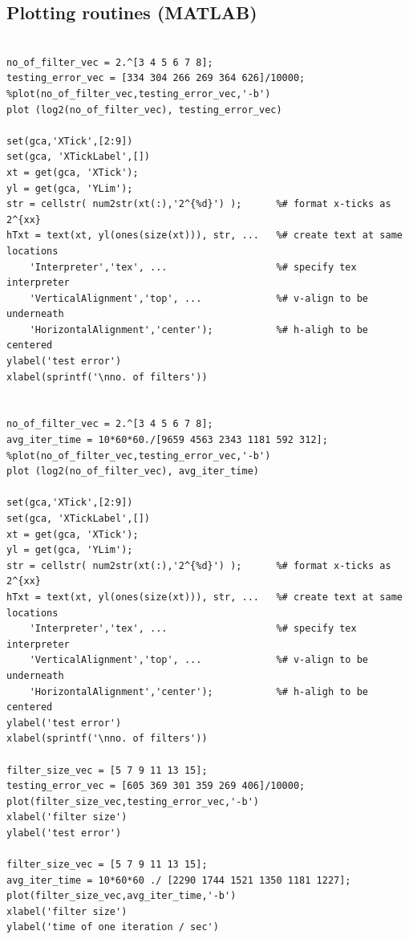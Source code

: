 \documentclass[10pt,twocolumn]{article}
\begin{document}
\subsection{Plotting routines (MATLAB)}
\begin{lstlisting}

no_of_filter_vec = 2.^[3 4 5 6 7 8];
testing_error_vec = [334 304 266 269 364 626]/10000;
%plot(no_of_filter_vec,testing_error_vec,'-b')
plot (log2(no_of_filter_vec), testing_error_vec)

set(gca,'XTick',[2:9])
set(gca, 'XTickLabel',[])
xt = get(gca, 'XTick');
yl = get(gca, 'YLim');
str = cellstr( num2str(xt(:),'2^{%d}') );      %# format x-ticks as 2^{xx}
hTxt = text(xt, yl(ones(size(xt))), str, ...   %# create text at same locations
    'Interpreter','tex', ...                   %# specify tex interpreter
    'VerticalAlignment','top', ...             %# v-align to be underneath
    'HorizontalAlignment','center');           %# h-aligh to be centered
ylabel('test error')
xlabel(sprintf('\nno. of filters'))


no_of_filter_vec = 2.^[3 4 5 6 7 8];
avg_iter_time = 10*60*60./[9659 4563 2343 1181 592 312];
%plot(no_of_filter_vec,testing_error_vec,'-b')
plot (log2(no_of_filter_vec), avg_iter_time)

set(gca,'XTick',[2:9])
set(gca, 'XTickLabel',[])
xt = get(gca, 'XTick');
yl = get(gca, 'YLim');
str = cellstr( num2str(xt(:),'2^{%d}') );      %# format x-ticks as 2^{xx}
hTxt = text(xt, yl(ones(size(xt))), str, ...   %# create text at same locations
    'Interpreter','tex', ...                   %# specify tex interpreter
    'VerticalAlignment','top', ...             %# v-align to be underneath
    'HorizontalAlignment','center');           %# h-aligh to be centered
ylabel('test error')
xlabel(sprintf('\nno. of filters'))

filter_size_vec = [5 7 9 11 13 15];
testing_error_vec = [605 369 301 359 269 406]/10000;
plot(filter_size_vec,testing_error_vec,'-b')
xlabel('filter size')
ylabel('test error')

filter_size_vec = [5 7 9 11 13 15];
avg_iter_time = 10*60*60 ./ [2290 1744 1521 1350 1181 1227];
plot(filter_size_vec,avg_iter_time,'-b')
xlabel('filter size')
ylabel('time of one iteration / sec')

\end{lstlisting}

{}

\end{document}
